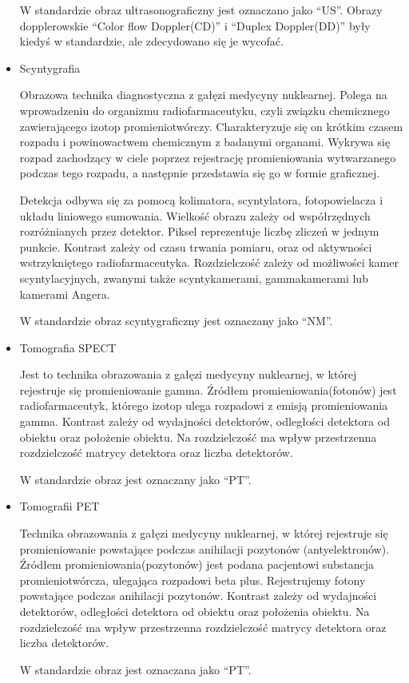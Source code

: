 \begin{itemize}
          W standardzie \DICOM obraz ultrasonograficzny jest oznaczano jako \enquote{US}.
          Obrazy dopplerowskie \enquote{Color flow Doppler(CD)} i \enquote{Duplex Doppler(DD)} były kiedyś w standardzie, ale zdecydowano się je wycofać.

    \item Scyntygrafia

          Obrazowa technika diagnostyczna z gałęzi medycyny nuklearnej.
          Polega na wprowadzeniu do organizmu radiofarmaceutyku, czyli związku chemicznego zawierającego izotop promieniotwórczy.
          Charakteryzuje się on krótkim czasem rozpadu i powinowactwem chemicznym z badanymi organami.
          Wykrywa się rozpad zachodzący w ciele poprzez rejestrację promieniowania wytwarzanego podczas tego rozpadu, a następnie przedstawia się go w formie graficznej.

          Detekcja odbywa się za pomocą kolimatora, scyntylatora, fotopowielacza i układu liniowego sumowania.
          Wielkość obrazu zależy od współrzędnych rozróżnianych przez detektor. 
          Piksel reprezentuje liczbę zliczeń w jednym punkcie.
          Kontrast zależy od czasu trwania pomiaru, oraz od aktywności wstrzykniętego radiofarmaceutyka.
          Rozdzielczość zależy od możliwości kamer scyntylacyjnych, zwanymi także scyntykamerami, gammakamerami lub kamerami Angera.

          W standardzie \DICOM obraz scyntygraficzny jest oznaczany jako \enquote{NM}.

    \item Tomografia SPECT

          Jest to technika obrazowania z gałęzi medycyny nuklearnej, w której rejestruje się promieniowanie gamma.
          Źródłem promieniowania(fotonów) jest radiofarmaceutyk, którego izotop ulega rozpadowi z emisją promieniowania gamma.
          Kontrast zależy od wydajności detektorów, odległości detektora od obiektu oraz położenie obiektu.
          Na rozdzielczość ma wpływ przestrzenna rozdzielczość matrycy detektora oraz liczba detektorów.

          W standardzie \DICOM obraz jest oznaczany jako \enquote{PT}.

    \item Tomografii PET

          Technika obrazowania  z gałęzi medycyny nuklearnej, w której rejestruje się promieniowanie powstające podczas anihilacji pozytonów (antyelektronów).
          Źródłem promieniowania(pozytonów) jest podana pacjentowi substancja promieniotwórcza, ulegająca rozpadowi beta plus.
          Rejestrujemy fotony powstające podczas anihilacji pozytonów.
          Kontrast zależy od wydajności detektorów, odległości detektora od obiektu oraz położenia obiektu.
          Na rozdzielczość ma wpływ przestrzenna rozdzielczość matrycy detektora oraz liczba detektorów.

          W standardzie \DICOM obraz jest oznaczana jako \enquote{PT}.

\end{itemize}

